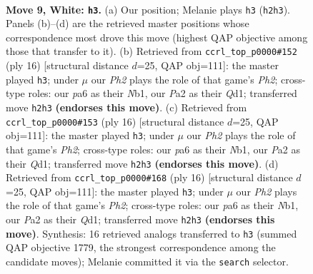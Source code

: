 \documentclass[11pt]{article}
\begin{document}
\begin{figure}[p]\centering
\begin{subfigure}{0.46\textwidth}\centering
\resizebox{\linewidth}{!}{%
\newchessgame
\chessboard[
  setfen={r1bq1rk1/2p1bppp/p1np1n2/1p2p3/4P3/1BN2N2/PPPP1PPP/R1BQR1K1 w - - 2 9},
  showmover=false,
  pgfstyle=straightmove, color=movearrow, markmove={h2-h3}
]}
\caption{}
\end{subfigure}\hfill
\begin{subfigure}{0.46\textwidth}\centering
\resizebox{\linewidth}{!}{%
\newchessgame
\chessboard[
  setfen={r1bq1rk1/2p1bppp/p1np1n2/1p2p3/4P3/1BP2N2/PP1P1PPP/RNBQR1K1 w - - 1 9},
  showmover=false,
  pgfstyle=straightmove, color=movearrow, markmove={h2-h3}
]}
\caption{}
\end{subfigure}
\\[4pt]
\begin{subfigure}{0.46\textwidth}\centering
\resizebox{\linewidth}{!}{%
\newchessgame
\chessboard[
  setfen={r1bq1rk1/2p1bppp/p1np1n2/1p2p3/4P3/1BP2N2/PP1P1PPP/RNBQR1K1 w - - 1 9},
  showmover=false,
  pgfstyle=straightmove, color=movearrow, markmove={h2-h3}
]}
\caption{}
\end{subfigure}\hfill
\begin{subfigure}{0.46\textwidth}\centering
\resizebox{\linewidth}{!}{%
\newchessgame
\chessboard[
  setfen={r1bq1rk1/2p1bppp/p1np1n2/1p2p3/4P3/1BP2N2/PP1P1PPP/RNBQR1K1 w - - 1 9},
  showmover=false,
  pgfstyle=straightmove, color=movearrow, markmove={h2-h3}
]}
\caption{}
\end{subfigure}
\caption{\textbf{Move 9, White: \texttt{h3}.} (a) Our position; Melanie plays \texttt{h3} (\texttt{h2h3}). Panels (b)--(d) are the retrieved master positions whose correspondence most drove this move (highest QAP objective among those that transfer to it). (b) Retrieved from \texttt{ccrl\_top\_p0000\#152} (ply 16) [structural distance $d$=25, QAP obj=111]: the master played \texttt{h3}; under $\mu$ our \emph{Ph2} plays the role of that game's \emph{Ph2}; cross-type roles: our \emph{p}a6 as their \emph{N}b1, our \emph{P}a2 as their \emph{Q}d1; transferred move \texttt{h2h3} \textbf{(endorses this move)}. (c) Retrieved from \texttt{ccrl\_top\_p0000\#153} (ply 16) [structural distance $d$=25, QAP obj=111]: the master played \texttt{h3}; under $\mu$ our \emph{Ph2} plays the role of that game's \emph{Ph2}; cross-type roles: our \emph{p}a6 as their \emph{N}b1, our \emph{P}a2 as their \emph{Q}d1; transferred move \texttt{h2h3} \textbf{(endorses this move)}. (d) Retrieved from \texttt{ccrl\_top\_p0000\#168} (ply 16) [structural distance $d$=25, QAP obj=111]: the master played \texttt{h3}; under $\mu$ our \emph{Ph2} plays the role of that game's \emph{Ph2}; cross-type roles: our \emph{p}a6 as their \emph{N}b1, our \emph{P}a2 as their \emph{Q}d1; transferred move \texttt{h2h3} \textbf{(endorses this move)}. Synthesis: 16 retrieved analogs transferred to \texttt{h3} (summed QAP objective 1779, the strongest correspondence among the candidate moves); Melanie committed it via the \texttt{search} selector.}
\label{fig:thought-m16}
\end{figure}
\end{document}
